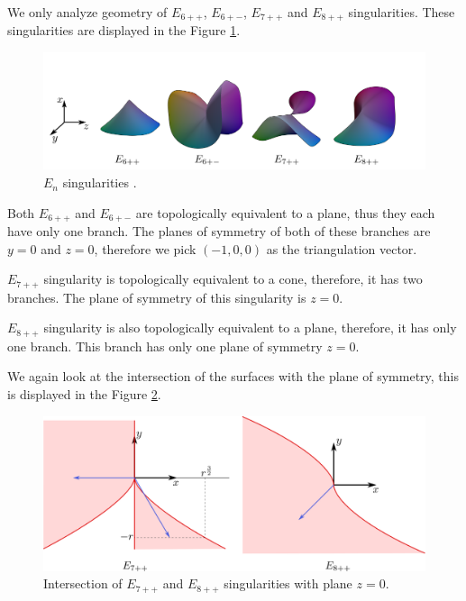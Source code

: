 We only analyze geometry of $E_{6++}$, $E_{6+-}$, $E_{7++}$ and $E_{8++}$
singularities. These singularities are displayed in the Figure \ref{img:12}.


\begin{figure}
    \centerline{\includegraphics[scale=0.5]{images/img12}}
    \caption[$E_n$ singularities.]
    {$E_n$ singularities \cite{morris2003client}.}
    \label{img:12}
\end{figure}
Both $E_{6++}$ and $E_{6+-}$ are topologically equivalent to a plane, thus
they each have only one branch. The planes of symmetry of both of these 
branches are $y=0$ and $z=0$, therefore we pick $(-1, 0, 0)$ as the
triangulation vector.

$E_{7++}$ singularity is topologically equivalent to a cone, therefore, it has
two branches. The plane of symmetry of this singularity is $z=0$.

$E_{8++}$ singularity is also topologically equivalent to a plane, therefore,
it has only one branch. This branch has only one plane of symmetry $z=0$.

We again look at the intersection of the surfaces with the plane of 
symmetry, this is displayed in the Figure \ref{img:10}.

\begin{figure}
    \centerline{\includegraphics[scale=0.5]{images/img10}}
    \caption[Intersection of $E_{7++}$ and $E_{8++}$ singularities with 
    plane $z=0$.]
    {Intersection of $E_{7++}$ and $E_{8++}$ singularities with 
    plane $z=0$.}
    \label{img:10}
\end{figure}

